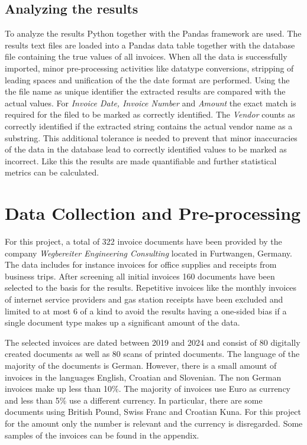 \subsection{Analyzing the results}
To analyze the results Python together with the Pandas framework are used. The results text files are loaded into a Pandas data table together with the database file
containing the true values of all invoices. When all the data is successfully imported, minor pre-processing activities like datatype conversions, stripping of leading spaces and unification of the the date format are performed.
Using the the file name as unique identifier the extracted results are compared with the actual values. For \textit{Invoice Date, Invoice Number}
and \textit{Amount} the exact match is required for the filed to be marked as correctly identified. 
The \textit{Vendor} counts as correctly identified if the extracted string contains the actual vendor name as a substring. This additional tolerance is needed to prevent that minor inaccuracies of the data in the database lead to correctly identified values to be marked as incorrect.
Like this the results are made quantifiable and further statistical metrics can be calculated.
\section{Data Collection and Pre-processing}
For this project, a total of 322 invoice documents have been provided by the company \textit{Wegbereiter Engineering Consulting} located in Furtwangen, Germany. The data includes for instance invoices for office supplies and receipts from business trips. After screening all initial invoices 160 documents have been selected to the basis for the results. Repetitive invoices like the monthly invoices of internet service providers and gas station receipts have been excluded and limited to at most 6 of a kind to avoid the results having a one-sided bias if a single document type makes up a significant amount of the data.

The selected invoices are dated between 2019 and 2024 and consist of 80 digitally created documents as well as 80 scans of printed documents. 
The language of the majority of the documents is German. However, there is a small amount of invoices in the languages English, Croatian and Slovenian. The non German invoices make up less than 10\%.
The majority of invoices use Euro as currency and less than 5\% use a different currency. In particular, there are some documents using British Pound, Swiss Franc and Croatian Kuna. For this project for the amount only the number is relevant and the currency is disregarded.
Some samples of the invoices can be found in the appendix.

